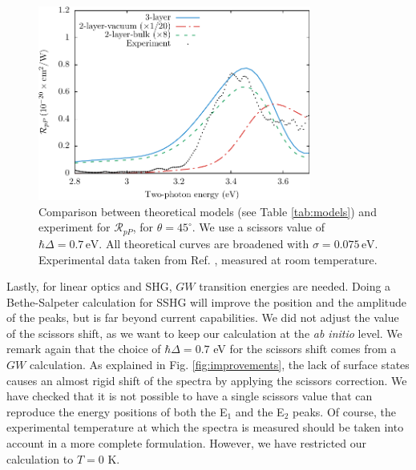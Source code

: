\documentclass[11pt]{book}
\begin{document}
\begin{figure}
\centering
\includegraphics[width=0.8\textwidth]{../figures/04-results/fig-4_4_07}
\caption{Comparison between theoretical models (see Table
\ref{tab:models}) and experiment for $\mathcal{R}_{pP}$, for
$\theta=45^{\circ}$. We use a scissors value of $\hbar\Delta = 0.7\,\text{eV}$.
All theoretical curves are broadened with $\sigma=0.075\,\text{eV}$.
Experimental data taken from Ref. \cite{mitchellSS01}, measured at room
temperature.}
\label{fig:mitchellRpP}
\end{figure}

Lastly, for linear optics and SHG, $GW$ transition energies are needed. Doing a Bethe-Salpeter calculation for SSHG will improve the position and the amplitude of the peaks, but is far beyond current capabilities.\cite{puff} We did not adjust the value of the scissors shift, as we want to keep our calculation at the {\em ab initio} level. We remark again that the choice of $\hbar\Delta=0.7$ eV for the scissors shift comes from a $GW$ calculation.\cite{liPRB10} As explained in Fig. \ref{fig:improvements}, the lack of surface states causes an almost rigid shift of the spectra by applying the scissors correction. We have checked that it is not possible to have a single scissors value that can reproduce the energy positions of both the E$_{1}$ and the E$_{2}$ peaks. Of course, the experimental temperature at which the spectra is measured should be taken into account in a more complete formulation. However, we have restricted our calculation to $T=0$ K.
\end{document}
